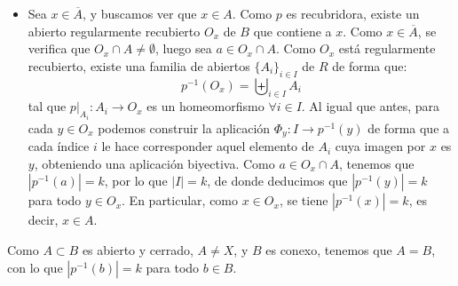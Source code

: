 \begin{ejercicio}
\begin{itemize}
            Para cada $x\in O_a$ podemos construir la aplicación $\Phi_x:I\to p^{-1}(x)$ de forma que a cada índice $i$ le hace corresponder aquel elemento de $A_i$ cuya imagen por $p$ es $x$.
            \begin{itemize}
                \item La aplicación $\Phi_x$ está bien definida, pues si $i \in I$, como la aplicación $p\big|_{A_i}:A_i\to O_a$ es un homeomorfismo, ha de existir un único elemento $y \in A_i$ tal que $p(y) = x$.
                \item $\Phi_x$ es inyectiva, pues si $i,j\in I$ con $\Phi_x(i) = \Phi_x(j)$, entonces tenemos $y\in A_i\cap A_j$ de forma que $p(y) = x$. Como la familia $\{A_i\}_{i \in I}$ es disjunta, ha de ser $i = j$.
                \item $\Phi_x$ es sobreyectiva, pues si:
                    \begin{equation*}
                        y \in p^{-1}(x) \subseteq p^{-1}(O_a) = \biguplus_{i \in I}A_i
                    \end{equation*}
                    entonces ha de existir $y \in A_i$ para cierto índice $i$ de forma que $p(y) = x$, con lo que $\Phi_x(i) = y$.
            \end{itemize}
            En definitiva, $\Phi_x$ es biyectiva para cada $x\in O_a$. Como en particular $p^{-1}(a)$ tiene $k$ elementos, tendremos entonces que $I$ tiene $k$ elementos, de donde $p^{-1}(x)$ tiene $k$ elementos, $\forall x\in O_a$, con lo que $O_a\subseteq A$. De donde deducimos que $A$ es abierto.
        \item Sea $x\in \overline{A}$, y buscamos ver que $x\in A$. Como $p$ es recubridora, existe un abierto regularmente recubierto $O_x$ de $B$ que contiene a $x$. Como $x\in \overline{A}$, se verifica que $O_x\cap A\neq \emptyset$, luego sea $a\in O_x\cap A$. Como $O_x$ está regularmente recubierto, existe una familia de abiertos $\{A_i\}_{i \in I}$ de $R$ de forma que:
            \begin{equation*}
                p^{-1}(O_x) = \biguplus_{i \in I}A_i
            \end{equation*}
            tal que $p\big|_{A_i}:A_i\to O_x$ es un homeomorfismo $\forall i \in I$. Al igual que antes, para cada $y \in O_x$ podemos construir la aplicación $\Phi_y:I\to p^{-1}(y)$ de forma que a cada índice $i$ le hace corresponder aquel elemento de $A_i$ cuya imagen por $x$ es $y$, obteniendo una aplicación biyectiva. Como $a\in O_x\cap A$, tenemos que $|p^{-1}(a)|=k$, por lo que $|I|=k$, de donde deducimos que $|p^{-1}(y)|=k$ para todo $y \in O_x$. En particular, como $x\in O_x$, se tiene $|p^{-1}(x)|=k$, es decir, $x\in A$.
    \end{itemize}

    Como $A\subset B$ es abierto y cerrado, $A\neq X$, y $B$ es conexo, tenemos que $A = B$, con lo que $|p^{-1}(b)|=k$ para todo $b\in B$.
\end{ejercicio}

